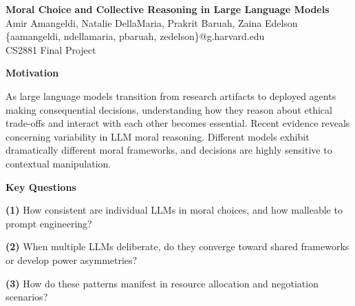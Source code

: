 \documentclass{article}
\begin{document}
\begin{center}
{\fontsize{48}{48}\selectfont\bfseries\color{CoreBlue} Moral Choice and Collective Reasoning in Large Language Models}\\[0.35in]
{\fontsize{28}{34}\selectfont Amir Amangeldi, Natalie DellaMaria, Prakrit Baruah, Zaina Edelson}\\[0.2in]
{\fontsize{24}{29}\selectfont \{aamangeldi, ndellamaria, pbaruah, zedelson\}@g.harvard.edu}\\[0.35in]
{\fontsize{28}{34}\selectfont CS2881 Final Project}

\end{center}

\vspace{0.80in}

\noindent\begin{minipage}[t]{5.2in}
{\fontsize{24}{29}\selectfont\bfseries\color{CoreBlue} Motivation}

\vspace{0.12in}

{\fontsize{16}{21}\selectfont
As large language models transition from research artifacts to deployed agents making consequential decisions, understanding how they reason about ethical trade-offs and interact with each other becomes essential. Recent evidence reveals concerning variability in LLM moral reasoning. Different models exhibit dramatically different moral frameworks, and decisions are highly sensitive to contextual manipulation.
\vspace{0.12in}

}
\end{minipage}%
\hfill
\begin{minipage}[t]{5.2in}
{\fontsize{24}{29}\selectfont\bfseries\color{CoreBlue} Key Questions}

\vspace{0.12in}

{\fontsize{16}{21}\selectfont
\textbf{(1)} How consistent are individual LLMs in moral choices, and how malleable to prompt engineering?

\vspace{0.1in}

\textbf{(2)} When multiple LLMs deliberate, do they converge toward shared frameworks or develop power asymmetries?

\vspace{0.1in}

\textbf{(3)} How do these patterns manifest in resource allocation and negotiation scenarios?

\vspace{0.1in}
}
\end{minipage}%
\end{document}
